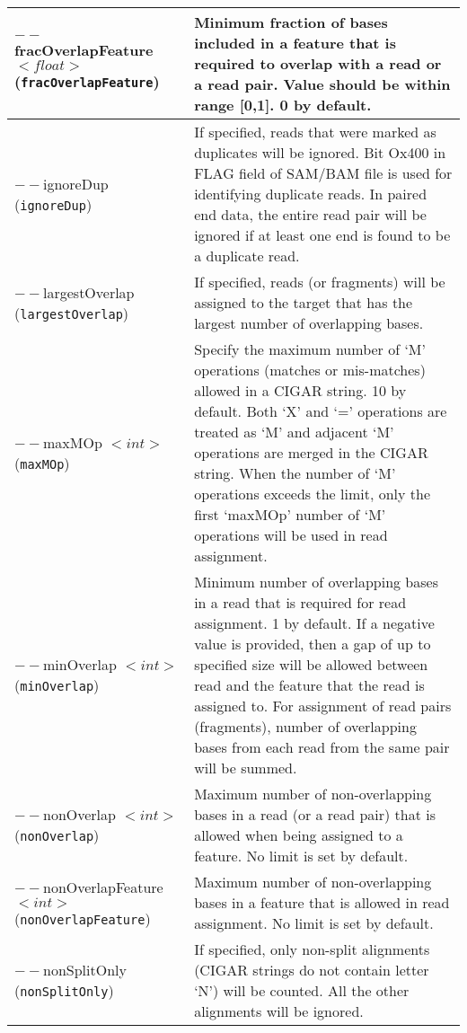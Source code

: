 \documentclass[12pt]{report}
\newcommand{\code}[1]{{\small\texttt{#1}}}
\begin{document}
\begin{longtable}{|p{5cm}|p{11cm}|}
\hline
$--$fracOverlapFeature $<float>$ \newline (\code{fracOverlapFeature}) & Minimum fraction of bases included in a feature that is required to overlap with a read or a read pair. Value should be within range [0,1]. 0 by default. \\
\hline
$--$ignoreDup \newline (\code{ignoreDup}) & If specified, reads that were marked as duplicates will be ignored. Bit Ox400 in FLAG field of SAM/BAM file is used for identifying duplicate reads. In paired end data, the entire read pair will be ignored if at least one end is found to be a duplicate read.\\
\hline
$--$largestOverlap \newline (\code{largestOverlap}) & If specified, reads (or fragments) will be assigned to the target that has the largest number of overlapping bases.\\
\hline
$--$maxMOp $<int>$ \newline (\code{maxMOp}) & Specify the maximum number of `M' operations (matches or mis-matches) allowed in a CIGAR string. 10 by default. Both `X' and `=' operations are treated as `M' and adjacent `M' operations are merged in the CIGAR string. When the number of `M' operations exceeds the limit, only the first `maxMOp' number of `M' operations will be used in read assignment.\\
\hline
$--$minOverlap $<int>$ \newline (\code{minOverlap}) & Minimum number of overlapping bases in a read that is required for read assignment. 1 by default. If a negative value is provided, then a gap of up to specified size will be allowed between read and the feature that the read is assigned to. For assignment of read pairs (fragments), number of overlapping bases from each read from the same pair will be summed. \\
\hline
$--$nonOverlap $<int>$ \newline (\code{nonOverlap}) & Maximum number of non-overlapping bases in a read (or a read pair) that is allowed when being assigned to a feature. No limit is set by default. \\
\hline
$--$nonOverlapFeature $<int>$ \newline (\code{nonOverlapFeature}) & Maximum number of non-overlapping bases in a feature that is allowed in read assignment. No limit is set by default. \\
\hline
$--$nonSplitOnly \newline (\code{nonSplitOnly}) & If specified, only non-split alignments (CIGAR strings do not contain letter `N') will be counted. All the other alignments will be ignored.\\

\end{longtable}
\end{document}
